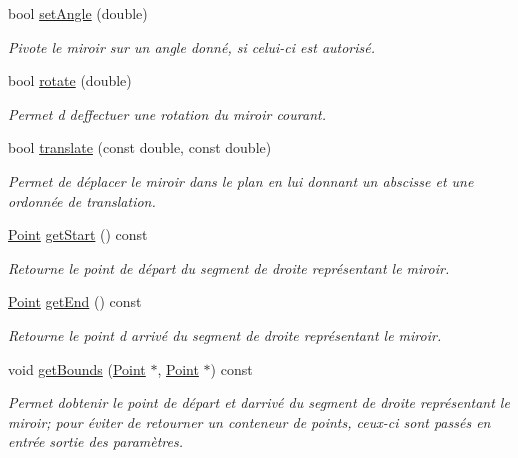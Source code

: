 \begin{DoxyCompactItemize}
bool \hyperlink{classMirror_aa5c28cf6d8a88d11f06b4140389c2a06}{set\+Angle} (double)
\begin{DoxyCompactList}\small\item\em Pivote le miroir sur un angle donné, si celui-\/ci est autorisé. \end{DoxyCompactList}\item 
bool \hyperlink{classMirror_a35dd50199a1bb8f2a0dea49259df6e95}{rotate} (double)
\begin{DoxyCompactList}\small\item\em Permet d d\textquotesingle{}effectuer une rotation du miroir courant. \end{DoxyCompactList}\item 
bool \hyperlink{classMirror_ac9c58d670d8c84b41135c07fedd0b502}{translate} (const double, const double)
\begin{DoxyCompactList}\small\item\em Permet de déplacer le miroir dans le plan en lui donnant un abscisse et une ordonnée de translation. \end{DoxyCompactList}\item 
\hyperlink{classPoint}{Point} \hyperlink{classMirror_aad24b622e2f9c18691ec70a1bbdadbcf}{get\+Start} () const 
\begin{DoxyCompactList}\small\item\em Retourne le point de départ du segment de droite représentant le miroir. \end{DoxyCompactList}\item 
\hyperlink{classPoint}{Point} \hyperlink{classMirror_ae9ba03e1a3d35a85f8b55ec6ea2a7462}{get\+End} () const 
\begin{DoxyCompactList}\small\item\em Retourne le point d\textquotesingle{} arrivé du segment de droite représentant le miroir. \end{DoxyCompactList}\item 
void \hyperlink{classMirror_a4d3fe38f3bbe5b546384ef0fb81f16c4}{get\+Bounds} (\hyperlink{classPoint}{Point} $\ast$, \hyperlink{classPoint}{Point} $\ast$) const 
\begin{DoxyCompactList}\small\item\em Permet d\textquotesingle{}obtenir le point de départ et d\textquotesingle{}arrivé du segment de droite représentant le miroir; pour éviter de retourner un conteneur de points, ceux-\/ci sont passés en entrée sortie des paramètres. \end{DoxyCompactList}\item 

\end{DoxyCompactItemize}

